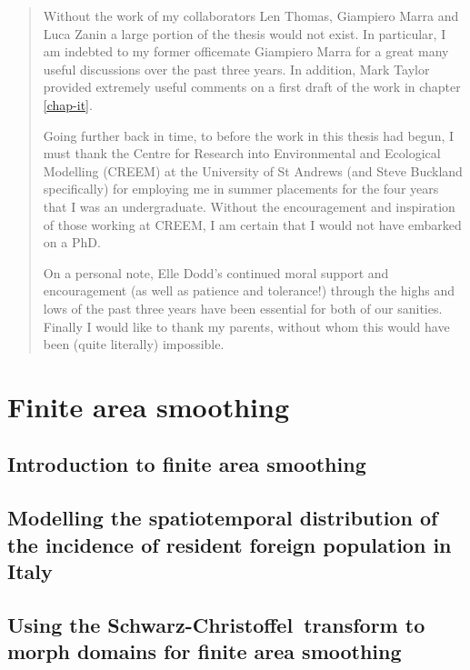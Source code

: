 \documentclass[12pt]{report}
\newcommand{\sch}{Schwarz-Christoffel}
\begin{document}
\begin{abstract}
Without the work of my collaborators Len Thomas, Giampiero Marra and Luca Zanin a large portion of the thesis would not exist. In particular, I am indebted to my former officemate Giampiero Marra for a great many useful discussions over the past three years. In addition, Mark Taylor provided extremely useful comments on a first draft of the work in chapter \ref{chap-it}.

Going further back in time, to before the work in this thesis had begun, I must thank the Centre for Research into Environmental and Ecological Modelling (CREEM) at the University of St Andrews (and Steve Buckland specifically) for employing me in summer placements for the four years that I was an undergraduate. Without the encouragement and inspiration of those working at CREEM, I am certain that I would not have embarked on a PhD.

On a personal note, Elle Dodd's continued moral support and encouragement (as well as patience and tolerance!) through the highs and lows of the past three years have been essential for both of our sanities. Finally I would like to thank my parents, without whom this would have been (quite literally) impossible.
\end{abstract}



\tableofcontents

\listoffigures

\listoftables

\part{Finite area smoothing}

\chapter{Introduction to finite area smoothing}



\chapter{Modelling the spatiotemporal distribution of the incidence of resident foreign population in Italy}



\chapter{Using the \sch\ transform to morph domains for finite area smoothing}
%
\end{document}
